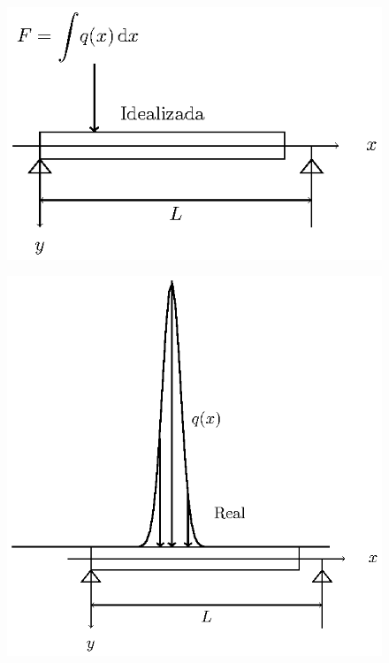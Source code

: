 \documentclass[12pt]{article}
\numberwithin{equation}{section}
\begin{document}
\begin{figure}[H]
    \centering
    \includegraphics[scale=1.3]{Imagenes/delta_Dirac_02a.eps}
    \label{fig:figura_delta_Dirac_02}
\end{figure}
\begin{figure}[H]
    \centering
    \includegraphics[scale=0.85]{Imagenes/delta_Dirac_02b.eps}
\end{figure}
\end{document}
